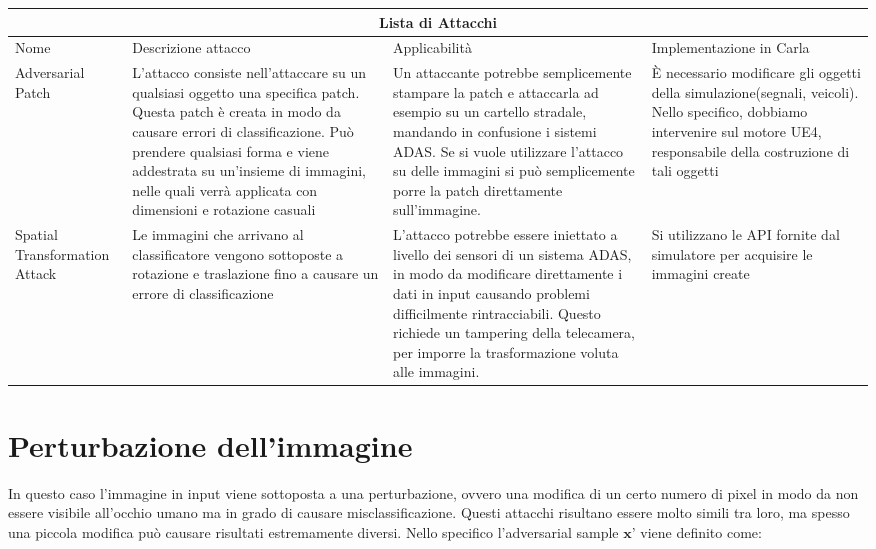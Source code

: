 \begin{tabular}{|p{3cm}||p{3cm}|p{3cm}|p{3cm}|}

 \hline
 \multicolumn{4}{|c|}{Lista di Attacchi} \\
 \hline
 Nome  & Descrizione attacco & Applicabilità &Implementazione in Carla\\
 \hline
 Adversarial Patch   \cite{patch}
 & L'attacco consiste nell'attaccare su un qualsiasi oggetto  una specifica patch. Questa patch  è creata in modo da  causare errori di classificazione. Può prendere qualsiasi forma  e viene addestrata su un'insieme di immagini, nelle quali verrà applicata con dimensioni e rotazione casuali 
 
 & Un attaccante potrebbe semplicemente stampare la patch e attaccarla ad esempio su un cartello stradale, mandando in confusione i sistemi ADAS. Se si vuole utilizzare l'attacco su delle immagini si può semplicemente porre la patch direttamente sull'immagine.

 & È necessario modificare gli oggetti della simulazione(segnali, veicoli). Nello specifico, dobbiamo intervenire sul motore UE4, responsabile della costruzione di tali oggetti   \\
 \hline
Spatial Transformation Attack \cite{spatial-attack}
 
 & Le immagini che arrivano al classificatore vengono sottoposte a rotazione e traslazione fino a causare un errore di classificazione

& L’attacco potrebbe essere iniettato a livello dei sensori di un sistema ADAS, in modo da modificare direttamente i dati in input causando problemi difficilmente rintracciabili. Questo richiede un tampering della telecamera, per imporre la trasformazione voluta alle immagini.

 & Si utilizzano le API fornite dal simulatore per acquisire le immagini create\\


 \hline
 
\end{tabular}
\section{Perturbazione dell'immagine}
In questo caso l'immagine in input viene sottoposta a una perturbazione, ovvero una modifica di un certo numero di pixel in modo da non essere visibile
 all’occhio umano ma in grado di causare misclassificazione. Questi attacchi risultano essere molto simili tra loro, ma spesso una piccola modifica può causare risultati estremamente diversi. Nello specifico l'adversarial sample $\textbf{x'}$ viene definito come:
 
